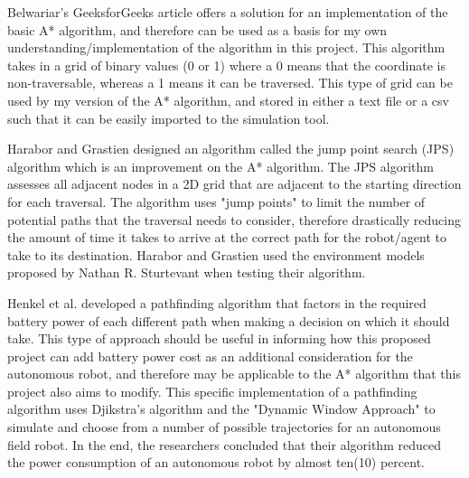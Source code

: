 \par
Belwariar's \cite{belwariar_2021} GeeksforGeeks article offers a solution for an implementation of the basic A* algorithm, and therefore can be used as a basis for my own understanding/implementation of the algorithm in this project. This algorithm takes in a grid of binary values (0 or 1) where a 0 means that the coordinate is non-traversable, whereas a 1 means it can be traversed. This type of grid can be used by my version of the A* algorithm, and stored in either a text file or a csv such that it can be easily imported to the simulation tool.
\par
Harabor and Grastien \cite{harabor2011online} designed an algorithm called the jump point search (JPS) algorithm which is an improvement on the A* algorithm. The JPS algorithm assesses all adjacent nodes in a 2D grid that are adjacent to the starting direction for each traversal. The algorithm uses "jump points" to limit the number of potential paths that the traversal needs to consider, therefore drastically reducing the amount of time it takes to arrive at the correct path for the robot/agent to take to its destination. Harabor and Grastien used the environment models proposed by Nathan R. Sturtevant \cite{sturtevant2012benchmarks} when testing their algorithm.
\par
Henkel et al. \cite{henkel2016energy} developed a pathfinding algorithm that factors in the required battery power of each different path when making a decision on which it should take. This type of approach should be useful in informing how this proposed project can add battery power cost as an additional consideration for the autonomous robot, and therefore may be applicable to the A* algorithm that this project also aims to modify. This specific implementation of a pathfinding algorithm uses Djikstra's algorithm and the "Dynamic Window Approach" to simulate and choose from a number of possible trajectories for an autonomous field robot. In the end, the researchers concluded that their algorithm reduced the power consumption of an autonomous robot by almost ten(10) percent.